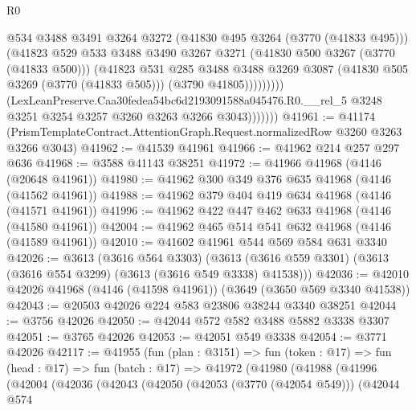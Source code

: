 \begin{lexlean}{R0}
\begin{coremodule}
                            @534
                            @3488
                            @3491
                            @3264
                            @3272
                            (@41830 @495 @3264 (@3770 (@41833 @495)))
                            (@41823
                              @529
                              @533
                              @3488
                              @3490
                              @3267
                              @3271
                              (@41830 @500 @3267 (@3770 (@41833 @500)))
                              (@41823
                                @531
                                @285
                                @3488
                                @3488
                                @3269
                                @3087
                                (@41830 @505 @3269 (@3770 (@41833 @505)))
                                (@3790 @41805)))))))))
                (LexLeanPreserve.Caa30fedea54bc6d2193091588a045476.R0.__rel_5
                  @3248
                  @3251
                  @3254
                  @3257
                  @3260
                  @3263
                  @3266
                  @3043)))))))
@41961 := @41174
    (PrismTemplateContract.AttentionGraph.Request.normalizedRow @3260 @3263 @3266 @3043)
@41962 := @41539 @41961
@41966 := @41962 @214 @257 @297 @636
@41968 := @3588 @41143 @38251
@41972 := @41966 @41968 (@4146 (@20648 @41961))
@41980 := @41962 @300 @349 @376 @635 @41968 (@4146 (@41562 @41961))
@41988 := @41962 @379 @404 @419 @634 @41968 (@4146 (@41571 @41961))
@41996 := @41962 @422 @447 @462 @633 @41968 (@4146 (@41580 @41961))
@42004 := @41962 @465 @514 @541 @632 @41968 (@4146 (@41589 @41961))
@42010 := @41602 @41961 @544 @569 @584 @631 @3340
@42026 := @3613
    (@3616 @564 @3303)
    (@3613 (@3616 @559 @3301) (@3613 (@3616 @554 @3299) (@3613 (@3616 @549 @3338) @41538)))
@42036 := @42010 @42026 @41968 (@4146 (@41598 @41961)) (@3649 (@3650 @569 @3340 @41538))
@42043 := @20503 @42026 @224 @583 @23806 @38244 @3340 @38251
@42044 := @3756 @42026
@42050 := @42044 @572 @582 @3488 @5882 @3338 @3307
@42051 := @3765 @42026
@42053 := @42051 @549 @3338
@42054 := @3771 @42026
@42117 := @41955
    (fun (plan : @3151) =>
    fun (token : @17) =>
    fun (head : @17) =>
    fun (batch : @17) =>
    @41972
      (@41980
        (@41988
          (@41996
            (@42004
              (@42036
                (@42043
                  (@42050
                    (@42053 (@3770 (@42054 @549)))
                    (@42044
                      @574

\end{coremodule}
\end{lexlean}
